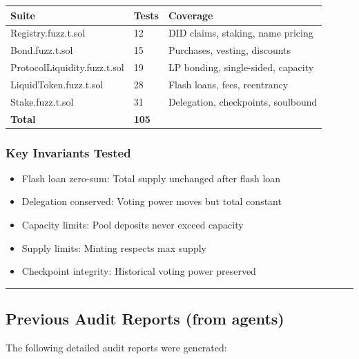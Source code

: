 \documentclass[
]{article}
\newcounter{none} %
\providecommand{\tightlist}{%
  \setlength{\itemsep}{0pt}\setlength{\parskip}{0pt}}
\begin{document}
{\def\LTcaptype{none} %
\begin{longtable}[]{@{}lll@{}}
\toprule\noalign{}
Suite & Tests & Coverage \\
\midrule\noalign{}
\endhead
\bottomrule\noalign{}
\endlastfoot
Registry.fuzz.t.sol & 12 & DID claims, staking, name pricing \\
Bond.fuzz.t.sol & 15 & Purchases, vesting, discounts \\
ProtocolLiquidity.fuzz.t.sol & 19 & LP bonding, single-sided,
capacity \\
LiquidToken.fuzz.t.sol & 28 & Flash loans, fees, reentrancy \\
Stake.fuzz.t.sol & 31 & Delegation, checkpoints, soulbound \\
\textbf{Total} & \textbf{105} & \\
\end{longtable}
}

\subsubsection{Key Invariants Tested}\label{key-invariants-tested}

\begin{itemize}
\tightlist
\item
  Flash loan zero-sum: Total supply unchanged after flash loan
\item
  Delegation conserved: Voting power moves but total constant
\item
  Capacity limits: Pool deposits never exceed capacity
\item
  Supply limits: Minting respects max supply
\item
  Checkpoint integrity: Historical voting power preserved
\end{itemize}

\begin{center}\rule{0.5\linewidth}{0.5pt}\end{center}

\subsection{Previous Audit Reports (from
agents)}\label{previous-audit-reports-from-agents}

The following detailed audit reports were generated:
\end{document}
